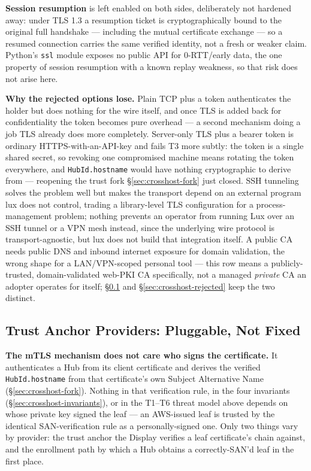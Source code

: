 \documentclass[a4paper,10pt]{article}
\newcommand{\field}[1]{\texttt{#1}}
\begin{document}
\textbf{Session resumption} is left enabled on both sides, deliberately
not hardened away: under TLS 1.3 a resumption ticket is cryptographically
bound to the original full handshake --- including the mutual certificate
exchange --- so a resumed connection carries the same verified identity,
not a fresh or weaker claim.  Python's \field{ssl} module exposes no
public API for 0-RTT/early data, the one property of session resumption
with a known replay weakness, so that risk does not arise here.

\textbf{Why the rejected options lose.}  Plain TCP plus a token
authenticates the holder but does nothing for the wire itself, and once
TLS is added back for confidentiality the token becomes pure overhead ---
a second mechanism doing a job TLS already does more completely.
Server-only TLS plus a bearer token is ordinary HTTPS-with-an-API-key and
fails T3 more subtly: the token is a single shared secret, so revoking one
compromised machine means rotating the token everywhere, and
\field{HubId.hostname} would have nothing cryptographic to derive from ---
reopening the trust fork \S\ref{sec:crosshost-fork} just closed.  SSH
tunneling solves the problem well but makes the transport depend on an
external program lux does not control, trading a library-level TLS
configuration for a process-management problem; nothing prevents an
operator from running Lux over an SSH tunnel or a VPN mesh instead, since
the underlying wire protocol is transport-agnostic, but lux does not build
that integration itself.  A public CA needs public DNS and inbound
internet exposure for domain validation, the wrong shape for a
LAN/VPN-scoped personal tool --- this row means a publicly-trusted,
domain-validated web-PKI CA specifically, not a managed \emph{private} CA
an adopter operates for itself; \S\ref{sec:crosshost-providers} and
\S\ref{sec:crosshost-rejected} keep the two distinct.

\subsection{Trust Anchor Providers: Pluggable, Not Fixed}\label{sec:crosshost-providers}

\textbf{The mTLS mechanism does not care who signs the certificate.}  It
authenticates a Hub from its client certificate and derives the verified
\field{HubId.hostname} from that certificate's own Subject Alternative
Name (\S\ref{sec:crosshost-fork}).  Nothing in that verification rule, in
the four invariants (\S\ref{sec:crosshost-invariants}), or in the T1--T6
threat model above depends on whose private key signed the leaf --- an
AWS-issued leaf is trusted by the identical SAN-verification rule as a
personally-signed one.  Only two things vary by provider: the trust
anchor the Display verifies a leaf certificate's chain against, and the
enrollment path by which a Hub obtains a correctly-SAN'd leaf in the
first place.
\end{document}
